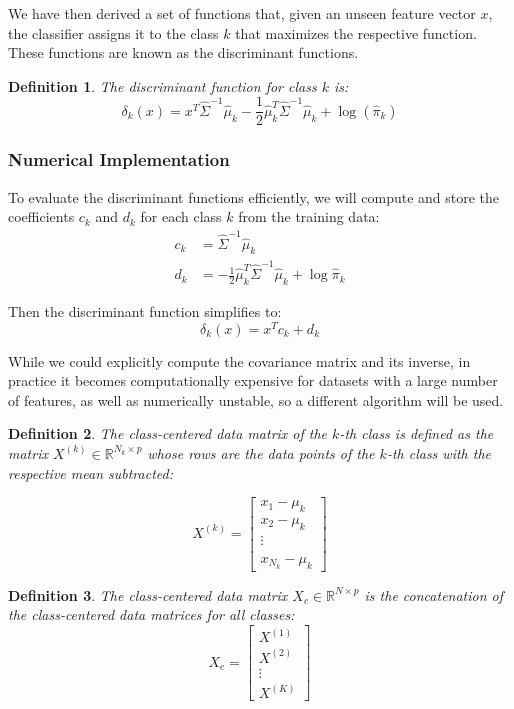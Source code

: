 \documentclass[a4paper,12pt]{article}
\newtheorem{definition}{Definition}
\begin{document}
We have then derived a set of functions that, given an unseen feature vector $x$, the classifier assigns it to the class $k$ that maximizes the respective function. These functions are known as the discriminant functions.

\begin{definition}
The discriminant function for class $k$ is:
\[
\delta_k(x) = x^T \hat{\Sigma}^{-1} \hat{\mu}_k - \frac{1}{2} \hat{\mu}_k^T \hat{\Sigma}^{-1} \hat{\mu}_k + \log(\hat{\pi}_k)
\]
\end{definition}

\subsubsection{Numerical Implementation}

To evaluate the discriminant functions efficiently, we will compute and store the coefficients $c_k$ and $d_k$ for each class $k$ from the training data:
\begin{align*}
c_k &= \hat{\Sigma}^{-1} \hat{\mu}_k \\
d_k &= -\frac{1}{2} \hat{\mu}_k^T \hat{\Sigma}^{-1} \hat{\mu}_k + \log \hat{\pi}_k
\end{align*}

Then the discriminant function simplifies to:
\[
\delta_k(x) = x^T c_k + d_k
\]

While we could explicitly compute the covariance matrix and its inverse, in practice it becomes computationally expensive for datasets with a large number of features, as well as numerically unstable, so a different algorithm will be used.

\begin{definition}
The class-centered data matrix of the $k$-th class is defined as the matrix $X^{(k)} \in \mathbb{R}^{N_{k} \times p}$ whose rows are the data points of the $k$-th class with the respective mean subtracted:

$$
X^{(k)} = \begin{bmatrix}
x_{1} - \mu_{k} \\
x_{2} - \mu_{k}  \\
\vdots \\  \\
x_{N_{k}} - \mu_{k}
\end{bmatrix}
$$
\end{definition}

\begin{definition}
The class-centered data matrix $X_c \in \mathbb{R}^{N \times p}$ is the concatenation of the class-centered data matrices for all classes:
\[
X_c = \begin{bmatrix}
X^{(1)} \\ X^{(2)} \\ \vdots \\ X^{(K)}
\end{bmatrix}
\]
\end{definition}
\end{document}
